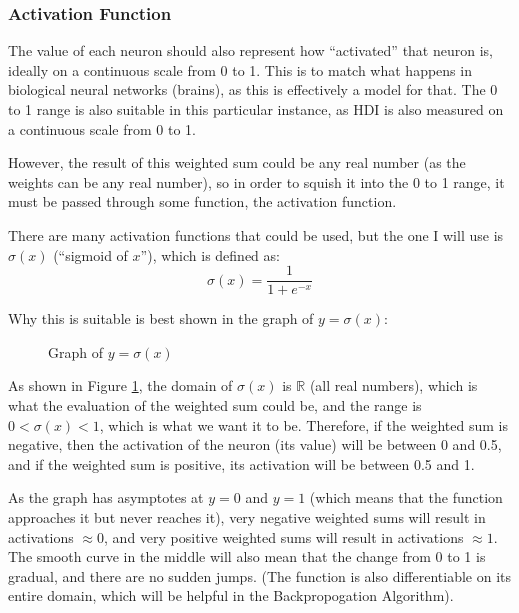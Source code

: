 \documentclass[12pt]{report}
\begin{document}
\subsubsection{Activation Function}
The value of each neuron should also represent how ``activated'' that neuron is, ideally on a continuous scale from 0 to 1. This is to match what happens in biological neural networks (brains), as this is effectively a model for that. The 0 to 1 range is also suitable in this particular instance, as HDI is also measured on a continuous scale from 0 to 1.

However, the result of this weighted sum could be any real number (as the weights can be any real number), so in order to squish it into the 0 to 1 range, it must be passed through some function, the activation function.

There are many activation functions that could be used, but the one I will use is $\sigma \left(x\right)$ (``sigmoid of $x$''), which is defined as:
\begin{equation}\label{eq:sigmoid}
    \sigma \left(x\right)=\frac{1}{1+e^{-x}}
\end{equation}

Why this is suitable is best shown in the graph of $y=\sigma \left(x\right)$:
\begin{figure}[H]
\centering
{}
\caption{Graph of $y=\sigma \left(x\right)$}\label{fig:sigmoidX}
\end{figure}

As shown in Figure \ref{fig:sigmoidX}, the domain of $\sigma \left(x\right)$ is $\mathbb{R}$ (all real numbers), which is what the evaluation of the weighted sum could be, and the range is $0<\sigma \left(x\right)<1$, which is what we want it to be. Therefore, if the weighted sum is negative, then the activation of the neuron (its value) will be between 0 and 0.5, and if the weighted sum is positive, its activation will be between 0.5 and 1.

As the graph has asymptotes at $y=0$ and $y=1$ (which means that the function approaches it but never reaches it), very negative weighted sums will result in activations $\approx 0$, and very positive weighted sums will result in activations $\approx 1$. The smooth curve in the middle will also mean that the change from 0 to 1 is gradual, and there are no sudden jumps. (The function is also differentiable on its entire domain, which will be helpful in the Backpropogation Algorithm).
\end{document}
